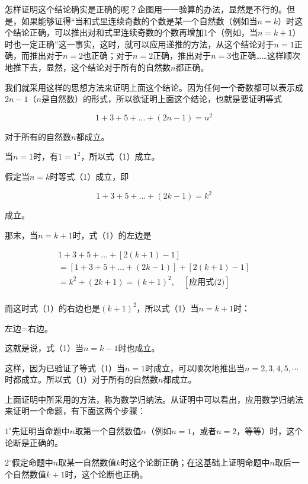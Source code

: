 怎样证明这个结论确实是正确的呢？企图用一一验算的办法，显然是不行的。但是，如果能够证得``当和式里连续奇数的个数是某一个自然数（例如当\(n = k\)）时这个结论正确，可以推出对和式里连续奇数的个数再增加1个（例如，当\(n = k + 1\)）时也一定正确''这一事实，这时，就可以应用递推的方法，从这个结论对于\(n = 1\)正确，而推出对于\(n = 2\)也正确；对于\(n = 2\)正确，推出对于\(n = 3\)也正确\ldots\ldots 这样顺次地推下去，显然，这个结论对于所有的自然数\(n\)都正确。

我们就采用这样的思想方法来证明上面这个结论。因为任何一个奇数都可以表示成\(2n - 1\)（\(n\)是自然数）的形式，所以欲证明上面这个结论，也就是要证明等式

\[
1 + 3 + 5 + \dots + (2 n - 1) = n^{2} \tag {1}
\]

对于所有的自然数\(n\)都成立。

 当\(n = 1\)时，有\(1 = 1^2\)，所以式（1）成立。

假定当\(n = k\)时等式（1）成立，即

\[
1 + 3 + 5 + \dots + (2 k - 1) = k^{2} \tag {2}
\]

成立。

那末，当\(n = k + 1\)时，式（1）的左边是

\[
\begin{array}{l} 1 + 3 + 5 + \dots + [ 2 (k + 1) - 1 ] \\ = [ 1 + 3 + 5 + \dots + (2 k - 1) ] + [ 2 (k + 1) - 1 ] \\ = k^{2} + (2 k + 1) = (k + 1)^{2}, \quad [ \text{应用式(2)} ] \\ \end{array}
\]

而这时式（1）的右边也是\((k + 1)^2\)，所以式（1）当\(n = k + 1\)时：

左边=右边。

这就是说，式（1）当\(n = k - 1\)时也成立。

这样，因为已验证了等式（1）当\(n = 1\)时成立，可以顺次地推出当\(n = 2, 3, 4, 5, \cdots\)时都成立。所以式（1）对于所有的自然数\(n\)都成立。

上面证明中所采用的方法，称为数学归纳法。从证明中可以看出，应用数学归纳法来证明一个命题，有下面这两个步骤：

\(1^{\circ}\)先证明当命题中\(n\)取第一个自然数值\(\alpha\)（例如\(n = 1\)，或者\(n = 2\)，等等）时，这个论断是正确的。

\(2^{\circ}\)假定命题中\(n\)取某一自然数值\(k\)时这个论断正确；在这基础上证明命题中\(n\)取后一个自然数值\(k + 1\)时，这个论断也正确。

